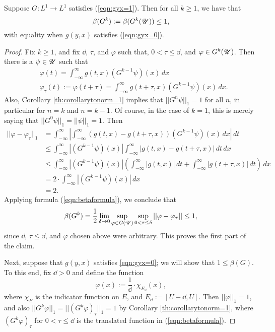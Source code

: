 \begin{lemma} \label{th:bgbounds}
	Suppose $G:L^1 \to L^1$ satisfies (\ref{eqn:gyx=1}). Then for all $k \geq 1$, we have that
	\[\beta(G^k):= \beta(G^k(\mathscr U)) \leq 1,\]
	with equality when $g(y,x)$ satisfies (\ref{eqn:gyx=0}).
\end{lemma}

\begin{proof}
	Fix $k \geq 1$, and fix $\dd$, $\tau$, and $\varphi$ such that, $0<\tau \leq \dd$, and $\varphi \in G^k(\mathscr U)$. Then there is a $\psi \in \mathscr U$ such that
	\begin{align*}
		&\varphi(t) = \int_{-\infty}^\infty g(t,x) (G^{k-1}\psi)(x) \, dx \\
		&\varphi_\tau(t) := \varphi(t+\tau) = \int_{-\infty}^\infty g(t+\tau, x) (G^{k-1}\psi)(x) \, dx.
	\end{align*}
	Also, Corollary \ref{th:corollarytonorm=1} implies that $||G^n \psi||_1 = 1$ for all $n$, in particular for $n = k$ and $n = k-1$. Of course, in the case of $k = 1$, this is merely saying that $||G^0\psi||_1 = ||\psi||_1 = 1$. Then
	\begin{align*}
		||\varphi-\varphi_\tau||_1 &= \int_{-\infty}^\infty \left| \int_{-\infty}^\infty (g(t,x) - g(t+\tau,x)) (G^{k-1}\psi)(x) \, dx \right| \, dt \\
		&\leq \int_{-\infty}^\infty |(G^{k-1}\psi)(x)| \int_{-\infty}^\infty |g(t,x)-g(t+\tau,x)| \, dt \, dx \\
		&\leq \int_{-\infty}^\infty |(G^{k-1}\psi)(x)| \left( \int_{-\infty}^\infty |g(t,x)| \, dt + \int_{-\infty}^\infty |g(t+\tau,x)| \, dt \right) \, dx \\
		&= 2 \cdot \int_{-\infty}^\infty |(G^{k-1}\psi)(x)| \, dx \\
		&= 2.
	\end{align*}
	Applying formula (\ref{eqn:betaformula}), we conclude that
	\[\beta(G^k) =\frac 12 \lim_{\delta \to 0} \sup_{\varphi \in G(\mathscr U)} \sup_{0<\tau \leq \delta} ||\varphi-\varphi_{\tau}|| \leq 1,\]
	since $\dd$, $\tau \leq \dd$, and $\varphi$ chosen above were arbitrary. This proves the first part of the claim.
	
	Next, suppose that $g(y,x)$ satisfies \ref{eqn:gyx=0}; we will show that $1 \leq \beta(G)$. To this end, fix $\dd>0$ and define the function
	\[\varphi(x) := \frac{1}{\dd} \cdot \chi_{E_\dd}(x),\]
	where $\chi_E$ is the indicator function on $E$, and $E_{\dd} := [U-\dd,U]$. Then $||\varphi||_1 = 1$, and also $||G^k\varphi||_1=||(G^k\varphi)_\tau||_1=1$ by Corollary \ref{th:corollarytonorm=1}, where $(G^k\varphi)_\tau$ for $0<\tau \leq \dd$ is the translated function in (\ref{eqn:betaformula}).
	

\end{proof}

